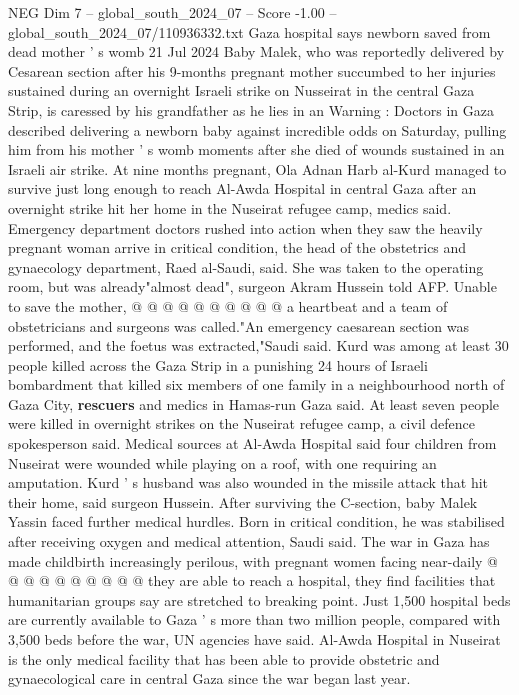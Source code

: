 \begin{textsample}{NEG Dim 7 – global\_south\_2024\_07 – Score -1.00 – global\_south\_2024\_07/110936332.txt}  \label{ex:f7_neg_353}
Gaza hospital says newborn saved from dead mother ' s womb 21 Jul 2024 Baby Malek, who was reportedly delivered by Cesarean section after his 9-months pregnant mother succumbed to her injuries sustained during an overnight Israeli strike on Nusseirat in the central Gaza Strip, is caressed by his grandfather as he lies in an Warning : Doctors in Gaza described delivering a newborn baby against incredible odds on Saturday, pulling him from his mother ' s womb moments after she died of wounds sustained in an Israeli air strike.
At nine months pregnant, Ola Adnan Harb al-Kurd managed to survive just long enough to reach Al-Awda Hospital in central Gaza after an overnight strike hit her home in the Nuseirat refugee camp, medics said.
Emergency department doctors rushed into action when they saw the heavily pregnant woman arrive in critical condition, the head of the obstetrics and gynaecology department, Raed al-Saudi, said.
She was taken to the operating room, but was already"almost dead", surgeon Akram Hussein told AFP.
Unable to save the mother, @ @ @ @ @ @ @ @ @ @ a heartbeat and a team of obstetricians and surgeons was called."An emergency caesarean section was performed, and the foetus was extracted,"Saudi said.
Kurd was among at least 30 people killed across the Gaza Strip in a punishing 24 hours of Israeli bombardment that killed six members of one family in a neighbourhood north of Gaza City, \textbf{rescuers} and medics in Hamas-run Gaza said.
At least seven people were killed in overnight strikes on the Nuseirat refugee camp, a civil defence spokesperson said.
Medical sources at Al-Awda Hospital said four children from Nuseirat were wounded while playing on a roof, with one requiring an amputation.
Kurd ' s husband was also wounded in the missile attack that hit their home, said surgeon Hussein.
After surviving the C-section, baby Malek Yassin faced further medical hurdles.
Born in critical condition, he was stabilised after receiving oxygen and medical attention, Saudi said.
The war in Gaza has made childbirth increasingly perilous, with pregnant women facing near-daily @ @ @ @ @ @ @ @ @ @ they are able to reach a hospital, they find facilities that humanitarian groups say are stretched to breaking point.
Just 1,500 hospital beds are currently available to Gaza ' s more than two million people, compared with 3,500 beds before the war, UN agencies have said.
Al-Awda Hospital in Nuseirat is the only medical facility that has been able to provide obstetric and gynaecological care in central Gaza since the war began last year.

\end{textsample}
